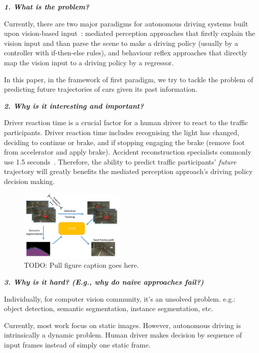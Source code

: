 \documentclass[10pt,twocolumn,letterpaper]{article}
\begin{document}
\textbf{\emph{1. What is the problem?}}

Currently, there are two major paradigms for autonomous driving systems built upon vision-based input~\cite{chen2015deepdriving}: mediated perception approaches that firstly explain the vision input and than parse the scene to make a driving policy (usually by a controller with if-then-else rules), and behaviour reflex approaches that directly map the vision input to a driving policy by a regressor.

In this paper, in the framework of first paradigm, we try to tackle the problem of predicting future trajectories of cars given its past information.

\textbf{\emph{2. Why is it interesting and important?}}

Driver reaction time is a crucial factor for a human driver to react to the traffic participants. Driver reaction time includes recognising the light has changed, deciding to continue or brake, and if stopping engaging the brake (remove foot from accelerator and apply brake). Accident reconstruction specialists commonly use 1.5 seconds~\cite{mcgehee2000driver}.
Therefore, the ability to predict traffic participants' \emph{future} trajectory will greatly benefits the mediated perception approach's driving policy decision making.

\begin{figure}[t]
        \centering
        \includegraphics[width=0.45\textwidth]{figures/pull_figure.pdf}
        \caption{ {\small TODO: Pull figure caption goes here.}}
        \label{fig:pull_figure}
\end{figure}
\textbf{\emph{3. Why is it hard? (E.g., why do naive approaches fail?)}}

Individually, for computer vision community, it's an unsolved problem. e.g.: object detection, semantic segmentation, instance segmentation, etc.


Currently, most work focus on static images. However, autonomous driving is intrinsically a dynamic problem. Human driver makes decision by sequence of input frames instead of simply one static frame.
\end{document}
